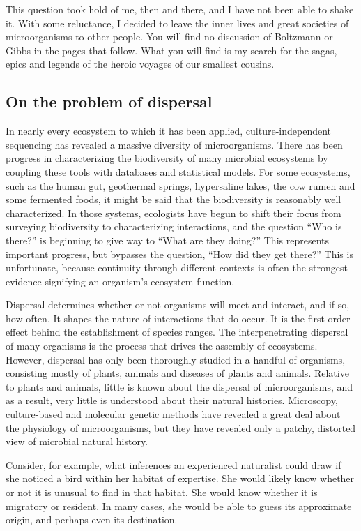 This question took hold of me, then and there, and I have not been able to shake it. With some reluctance, I decided to leave the inner lives and great societies of microorganisms to other people. You will find no discussion of Boltzmann or Gibbs in the pages that follow. What you will find is my search for the sagas, epics and legends of the heroic voyages of our smallest cousins.

\subsection*{On the problem of dispersal}

In nearly every ecosystem to which it has been applied, culture-independent sequencing has revealed a massive diversity of microorganisms. There has been progress in characterizing the biodiversity of many microbial ecosystems by coupling these tools with databases and statistical models. For some ecosystems, such as the human gut, geothermal springs, hypersaline lakes, the cow rumen and some fermented foods, it might be said that the biodiversity is reasonably well characterized. In those systems, ecologists have begun to shift their focus from surveying biodiversity to characterizing interactions, and the question ``Who is there?'' is beginning to give way to ``What are they doing?'' This represents important progress, but bypasses the question, ``How did they get there?'' This is unfortunate, because continuity through different contexts is often the strongest evidence signifying an organism's ecosystem function.

Dispersal determines whether or not organisms will meet and interact, and if so, how often. It shapes the nature of interactions that do occur. It is the first-order effect behind the establishment of species ranges. The interpenetrating dispersal of many organisms is the process that drives the assembly of ecosystems. However, dispersal has only been thoroughly studied in a handful of organisms, consisting mostly of plants, animals and diseases of plants and animals. Relative to plants and animals, little is known about the dispersal of microorganisms, and as a result, very little is understood about their natural histories. Microscopy, culture-based and molecular genetic methods have revealed a great deal about the physiology of microorganisms, but they have revealed only a patchy, distorted view of microbial natural history.

Consider, for example, what inferences an experienced naturalist could draw if she noticed a bird within her habitat of expertise. She would likely know whether or not it is unusual to find in that habitat. She would know whether it is migratory or resident. In many cases, she would be able to guess its approximate origin, and perhaps even its destination.

